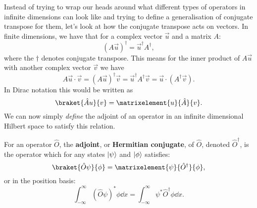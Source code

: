 \documentclass[../quantum_mechanics.tex]{subfiles}
\begin{document}
            Instead of trying to wrap our heads around what different types of operators in infinite dimensions can look like and trying to define a generalisation of conjugate transpose for them, let's look at how the conjugate transpose acts on vectors.
            In finite dimensions, we have that for a complex vector $\vec{u}$ and a matrix $A$:
            \begin{equation}
                (A\vec{u})^\dagger=\vec{u}^\dagger A^\dagger,
            \end{equation}
            where the $\dagger$ denotes conjugate transpose.
            This means for the inner product of $A\vec{u}$ with another complex vector $\vec{v}$ we have
            \begin{equation}
                A\vec{u}\cdot\vec{v}=(A\vec{u})^\dagger\vec{v}=\vec{u}^\dagger A^\dagger\vec{v}=\vec{u}\cdot(A^\dagger\vec{v}).
            \end{equation}
            In Dirac notation this would be written as
            \begin{equation}
                \braket{\hat{A}u}{v}=\matrixelement{u}{\hat{A}}{v}.
            \end{equation}
            We can now simply \textit{define} the adjoint of an operator in an infinite dimensional Hilbert space to satisfy this relation.
            \begin{definition}
                For an operator $\hat{O}$, the \textbf{adjoint}, or \textbf{Hermitian conjugate}, of $\hat{O}$, denoted $\hat{O}^\dagger$, is the operator which for any states $\lvert\psi\rangle$ and $\lvert\phi\rangle$ satisfies:
                \begin{equation}\label{eq:adjoint-braket}
                    \braket{\hat{O}\psi}{\phi}=\matrixelement{\psi}{\hat{O}^\dagger}{\phi},
                \end{equation}
                or in the position basis:
                \begin{equation}\label{eq:adjoint-integral}
                    \int_{-\infty}^\infty(\hat{O}\psi)^\ast\phi\dd{x}=\int_{-\infty}^\infty\psi^\ast\hat{O}^\dagger\phi\dd{x}.
                \end{equation}
            \end{definition}
\end{document}
